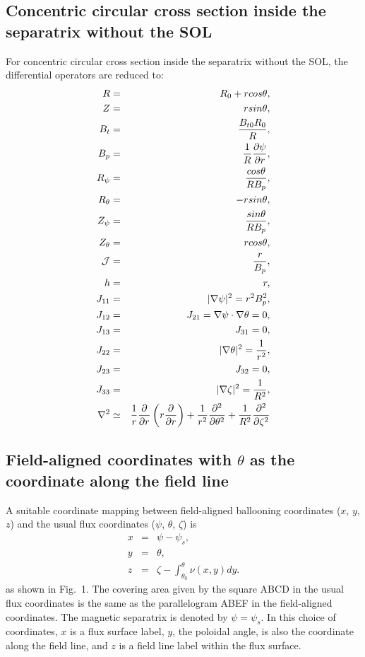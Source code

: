 \documentclass [11pt]{article}
\begin{document}
\subsection{Concentric circular cross section inside the separatrix without the SOL}
For concentric circular cross section inside the separatrix without the SOL, the differential operators are reduced to:
\begin{eqnarray}
R&=&R_0+rcos\theta, \\
Z&=&rsin\theta, \\
B_t&=&{B_{t0}R_0\over R}, \\
B_p&=&{1\over R}{\partial\psi\over\partial r}, \\
R_\psi&=&{cos\theta\over RB_p}, \\
R_\theta&=&-rsin\theta, \\
Z_\psi&=&{sin\theta\over RB_p}, \\
Z_\theta&=&rcos\theta, \\
{\cal J}&=&{r\over B_p}, \\
h&=&r, \\
J_{11}&=&|\nabla\psi|^2=r^2B_p^2, \\
J_{12}&=&J_{21}=\nabla\psi\cdot\nabla\theta=0,\\
J_{13}&=&J_{31}=0, \\
J_{22}&=&|\nabla\theta|^2={1\over r^2}, \\
J_{23}&=&J_{32}=0, \\
J_{33}&=&|\nabla\zeta|^2={1\over R^2},\\
\nabla^2&\simeq&{1\over r}{\partial\over\partial r}\left(r{\partial\over\partial r}\right)+{1\over r^2}{\partial^2\over\partial \theta^2}+{1\over R^2}{\partial^2\over\partial \zeta^2}
\end{eqnarray}

\newpage
\subsection{\bf  Field-aligned coordinates with $\theta$ as the coordinate along the field line}
A suitable coordinate mapping between  field-aligned ballooning coordinates ($x$, $y$, $z$) 
and the usual flux coordinates ($\psi$, $\theta$, $\zeta$)  is
\begin{eqnarray}
x&=&\psi-\psi_s, \nonumber \\
y&=&\theta, \nonumber \\
z&=&\zeta-\int_{\theta_0}^\theta \nu(x,y)dy.
\end{eqnarray}
as shown in Fig.~1.
The covering area given by the square ABCD in the usual flux coordinates is the same as the parallelogram ABEF in the 
field-aligned coordinates. 
The magnetic separatrix is denoted by $\psi=\psi_s$. 
In this choice of coordinates, $x$ is a flux surface label, $y$, the poloidal angle, is also
the coordinate along the field line, and $z$ is a field line label within the flux surface.
\end{document}
